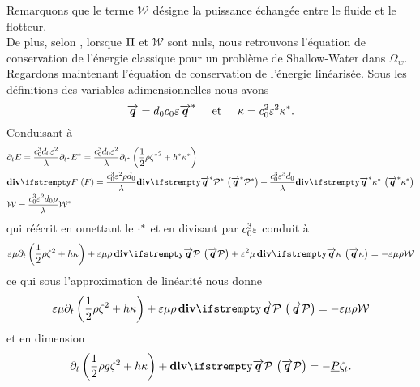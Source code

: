 \noindent Remarquons que le terme $\mathcal{W}$ désigne la puissance échangée entre le fluide et le flotteur.\\

\noindent De plus, selon \citet{bosi_spectral_2019}, lorsque $\Pi$ et $\mathcal{W}$ sont nuls, nous retrouvons l'équation de conservation de l'énergie classique pour un problème de Shallow-Water dans $\Omega_w$.\\

\noindent Regardons maintenant l'équation de conservation de l'énergie linéarisée. Sous les définitions des variables adimensionnelles nous avons 
\begin{equation*}
	\overrightarrow{\boldsymbol{q}} = d_0c_0\varepsilon{{\overrightarrow{\boldsymbol{q}}}^{*}} \hspace{5mm}\text{et}\hspace{5mm} \kappa = c_0^2\varepsilon^2{{\kappa}^{*}}.
\end{equation*}
Conduisant à
\begin{align}
	&\partial_t E =  \frac{c_0^3 d_0 \eps^2}{\lambda} \partial_{\tostar{t}}\tostar{E} = \frac{c_0^3 d_0 \eps^2}{\lambda} \partial_{\tostar{t}}\left(\frac{1}{2}\rho \tostar{\zeta}^2 + \tostar{h}\tostar{\kappa}\right)\\
	&\div[F] = \frac{c_0^3\eps^2\rho d_0}{\lambda}\div[\tostar{\boldvec{q}}\tostar{\mathcal{P}}] + \frac{c_0^3 \eps ^3 d_0}{\lambda}\div[\tostar{\boldvec{q}}\tostar{\kappa}]\\
	&\mathcal{W} = \frac{c_0^3 \eps^2 d_0\rho}{\lambda}\tostar{\mathcal{W}}
\end{align}
qui réécrit en omettant le ${{\cdot}^{*}}$ et en divisant par $c_0^3\varepsilon$ conduit à 
\begin{equation}
	\eps \mu \partial_t\left(\frac{1}{2}\rho \zeta^2 + h\kappa\right) + \eps\mu\rho \,\div[\boldvec{q}\mathcal{P}] + \eps^2\mu\, \div[\boldvec{q}\kappa] = - \eps\mu \rho\mathcal{W}
\end{equation}
ce qui sous l'approximation de linéarité nous donne 
\begin{equation}
\eps \mu \partial_t\left(\frac{1}{2}\rho \zeta^2 + h\kappa\right) + \eps\mu\rho \,\div[\boldvec{q}\mathcal{P}] = - \eps\mu \rho\mathcal{W}
\end{equation}
et en dimension
\begin{equation}
\partial_t\left(\frac{1}{2}\rho g\zeta^2 + h \kappa\right) + \div[\boldvec{q}\mathcal{P}] = - \underline{P}\zeta_t.
\end{equation}

